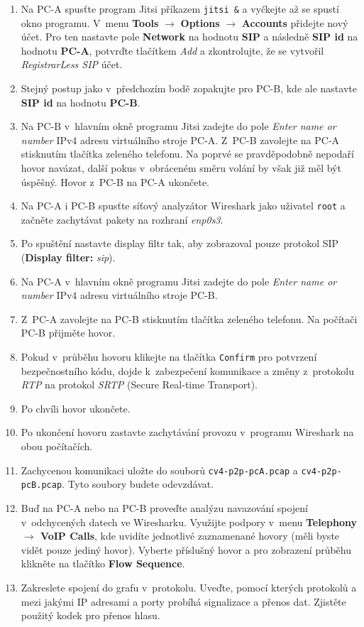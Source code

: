 \begin{enumerate}
    \item Na PC-A spusťte program Jitsi příkazem \texttt{jitsi \&} a vyčkejte až se spustí okno programu.
	V~menu {\bf Tools} $\rightarrow$ {\bf Options} $\rightarrow$ {\bf Accounts} přidejte nový účet. Pro ten nastavte pole {\bf Network} na hodnotu {\bf SIP} a následně {\bf SIP id} na hodnotu {\bf PC-A}, potvrďte tlačítkem \emph{Add} a zkontrolujte, že se vytvořil {\it RegistrarLess SIP} účet.
    \item Stejný postup jako v~předchozím bodě zopakujte pro PC-B, kde ale nastavte {\bf SIP id} na hodnotu {\bf PC-B}.
	\item Na PC-B v hlavním okně programu Jitsi zadejte do pole {\it Enter name or number} IPv4 adresu virtuálního stroje PC-A.
	Z~PC-B zavolejte na PC-A stisknutím tlačítka zeleného telefonu. Na poprvé se pravděpodobně nepodaří hovor navázat, další pokus v~obráceném směru volání by však již měl být úspěšný.
	Hovor z~PC-B na PC-A ukončete.
	\item Na PC-A i PC-B spusťte síťový analyzátor Wireshark jako uživatel \texttt{root} a začněte zachytávat pakety na rozhraní \emph{enp0s3}.
    \item Po spuštění nastavte display filtr tak, aby zobrazoval pouze protokol SIP (\textbf{Display filter:} \emph{sip}).
    \item Na PC-A v hlavním okně programu Jitsi zadejte do pole {\it Enter name or number} IPv4 adresu virtuálního stroje PC-B.
    \item Z~PC-A zavolejte na PC-B stisknutím tlačítka zeleného telefonu. Na počítači PC-B přijměte hovor.
	\item Pokud v~průběhu hovoru klikejte na tlačítka \texttt{Confirm} pro potvrzení bezpečnostního kódu, dojde k~zabezpečení komunikace a změny z~protokolu \emph{RTP} na protokol \emph{SRTP} (Secure Real-time Transport).
	\item Po chvíli hovor ukončete.
	\item Po ukončení hovoru zastavte zachytávání provozu v~programu Wireshark na obou počítačích.
	\item Zachycenou komunikaci uložte do souborů \texttt{cv4-p2p-pcA.pcap} a \texttt{cv4-p2p-pcB.pcap}. Tyto soubory budete odevzdávat.
    \item Buď na PC-A nebo na PC-B proveďte analýzu navazování spojení v~odchycených datech ve Wiresharku. Využijte podpory v~menu {\bf Telephony $\rightarrow$ VoIP Calls}, kde uvidíte jednotlivé zaznamenané hovory (měli byste vidět pouze jediný hovor). Vyberte příslušný hovor a pro zobrazení průběhu klikněte na tlačítko {\bf Flow Sequence}.
    \item Zakreslete spojení do grafu v~protokolu. Uveďte, pomocí kterých protokolů a mezi jakými IP adresami a porty probíhá signalizace a přenos dat. Zjistěte použitý kodek pro přenos hlasu.\\


\end{enumerate}
